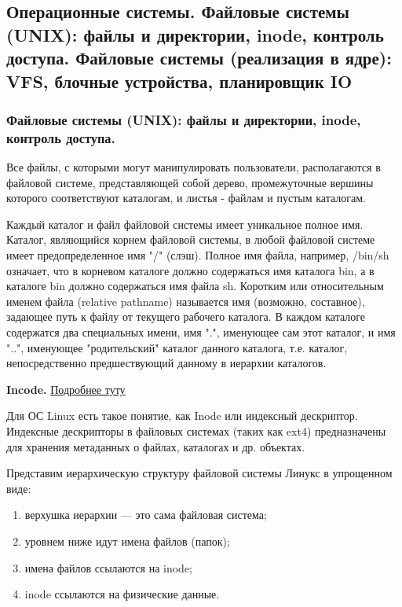 \documentclass{article}
\begin{document}
\subsection{Операционные системы. Файловые системы (UNIX): файлы и директории, inode, контроль доступа. Файловые системы (реализация в ядре): VFS, блочные устройства, планировщик IO}

\subsubsection{Файловые системы (UNIX): файлы и директории, inode, контроль доступа.}

Все файлы, с которыми могут манипулировать пользователи, располагаются в файловой системе, представляющей собой дерево, промежуточные вершины которого соответствуют каталогам, и листья - файлам и пустым каталогам. 

Каждый каталог и файл файловой системы имеет уникальное полное имя. Каталог, являющийся корнем файловой системы, в любой файловой системе имеет предопределенное имя "/" (слэш). Полное имя файла, например, /bin/sh означает, что в корневом каталоге должно содержаться имя каталога bin, а в каталоге bin должно содержаться имя файла sh. 
Коротким или относительным именем файла (relative pathname) называется имя (возможно, составное), задающее путь к файлу от текущего рабочего каталога. 
В каждом каталоге содержатся два специальных имени, имя ".", именующее сам этот каталог, и имя "..", именующее "родительский" каталог данного каталога, т.е. каталог, непосредственно предшествующий данному в иерархии каталогов.

\textbf{Incode.} \href{https://freehost.com.ua/faq/articles/inode-v-linux--chto-eto-takoe/}{Подробнее туту}

Для ОС Linux есть такое понятие, как Inode или индексный дескриптор. Индексные дескрипторы в файловых системах (таких как ext4) предназначены для хранения метаданных о файлах, каталогах и др. объектах.

Представим иерархическую структуру файловой системы Линукс в упрощенном виде:
\begin{enumerate}
	\item верхушка иерархии — это сама файловая система;
	\item уровнем ниже идут имена файлов (папок);
	\item имена файлов ссылаются на inode;
	\item inode ссылаются на физические данные.
\end{enumerate}
\end{document}
